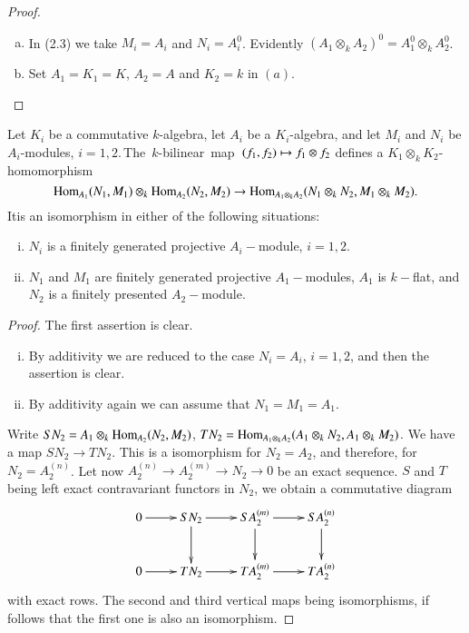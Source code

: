 \begin{proof}
\begin{enumerate}[(a)]
\item In (2.3) we take $M_i = A_i$ and $N_i = A^0_i$. Evidently $(A_1
  \otimes_k A_2)^0 = A^0_1 \otimes_k A^0_2$. 

\item Set $A_1 = K_1 = K$, $A_2 = A$ and $K_2 = k$ in $(a)$.
\end{enumerate}
\end{proof}

\setcounter{lemma}{4}
\begin{lemma} %
Let $K_i$ be a commutative $k$-algebra, let $A_i$ be a $K_i$-algebra,
and let $M_i$ and $N_i$ be $A_i$-modules, $i = 1, 2$.\,\hbox{The $k$-bilinear
map}~$(f_1, f_2)\break \mapsto f_1 \otimes f_2$ defines a $K_1 
\otimes_k K_2$-homomorphism 
$$
\operatorname{Hom}_{A_1} (N_1, M_1) \otimes_k \operatorname{Hom}_{A_2} (N_2, M_2) \rightarrow
\operatorname{Hom}_{A_1 \otimes_k A_2} (N_1 \otimes_k N_2, M_1 \otimes_k M_2). 
$$
It\pageoriginale is an isomorphism in either of the following situations:
\begin{enumerate}[(i)]
\item $N_i$ is a finitely generated projective $A_i-$module,
  $i = 1, 2$. 

\item $N_1$ and $M_1$ are finitely generated projective
  $A_1-$modules, $A_1$ is $k-$flat, and $N_2$ is a finitely
  presented $A_2-$module. 
\end{enumerate}
\end{lemma}

\begin{proof}
The first assertion is clear.
\begin{enumerate}[(i)]
\item By additivity we are reduced to the case $N_i = A_i$, $i = 1,
  2$, and then the assertion is clear. 

\item By additivity again we can assume that $N_1 = M_1 = A_1$.
\end{enumerate}

Write $SN_2 = A_1 \otimes_k \operatorname{Hom}_{A_2}(N_2, M_2)$, $TN_2 = \Hom_{A_1
  \otimes_k A_2} (A_1 \otimes_k N_2,\break A_1 \otimes_k M_2)$. We have a
map $SN_2 \to TN_2$. This is a isomorphism for $N_2 = A_2$, and
therefore, for $N_2 = A^{(n)}_2$. Let now $A^{(n)}_2 \to A^{(m)}_2 \to
N_2 \to 0$ be an exact sequence. $S$ and $T$ being left exact
contravariant functors in $N_2$, we obtain a commutative diagram 
\[
\xymatrix{
0 \ar[r] & SN_2 \ar[r] \ar[d] & SA^{(m)}_2 \ar[r] \ar[d] & SA^{(n)}_2
\ar[d]\\
0 \ar[r] & TN_2 \ar[r] & TA^{(m)}_2 \ar[r] & TA^{(n)}_2
}
\]
with  exact rows. The second and third vertical maps being
isomorphisms, if follows that the first one is also an isomorphism. 
\end{proof}

